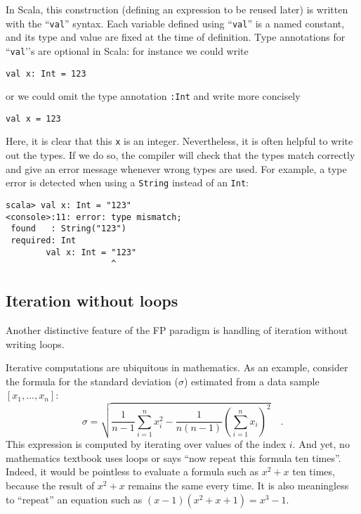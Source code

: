 In Scala, this construction (defining an expression to be reused later)
is written with the \textsf{``}\lstinline!val!\textsf{''} syntax. Each variable defined
using \textsf{``}\lstinline!val!\textsf{''} is a named constant, and its type and
value are fixed at the time of definition. Type annotations for \textsf{``}\lstinline!val!'\textsf{'}s
are optional in Scala: for instance we could write 
\begin{lstlisting}
val x: Int = 123
\end{lstlisting}
or we could omit the type annotation \lstinline!:Int! and write more
concisely
\begin{lstlisting}
val x = 123
\end{lstlisting}
Here, it is clear that this \texttt{}\lstinline!x! is an integer.
Nevertheless, it is often helpful to write out the types. If we do
so, the compiler will check that the types match correctly and give
an error message whenever wrong types are used. For example, a type
error is detected when using a \lstinline!String! instead of an \lstinline!Int!:
\begin{lstlisting}
scala> val x: Int = "123"
<console>:11: error: type mismatch;
 found   : String("123")
 required: Int
        val x: Int = "123"
                     ^
\end{lstlisting}


\subsection{Iteration without loops}

Another distinctive feature of the FP paradigm is handling of iteration
without writing loops.

Iterative computations are ubiquitous in mathematics. As an example,
consider the formula for the standard deviation ($\sigma$) estimated
from a data sample $\left[x_{1},...,x_{n}\right]$:
\[
\sigma=\sqrt{\frac{1}{n-1}\sum_{i=1}^{n}x_{i}^{2}-\frac{1}{n\left(n-1\right)}\left(\sum_{i=1}^{n}x_{i}\right)^{2}}\quad.
\]
This expression is computed by iterating over values of the index
$i$. And yet, no mathematics textbook uses loops or says \textsf{``}now repeat
this formula ten times\textsf{''}. Indeed, it would be pointless to evaluate
a formula such as $x^{2}+x$ ten times, because the result of $x^{2}+x$
remains the same every time. It is also meaningless to \textsf{``}repeat\textsf{''}
an equation such as $\left(x-1\right)(x^{2}+x+1)=x^{3}-1$.

